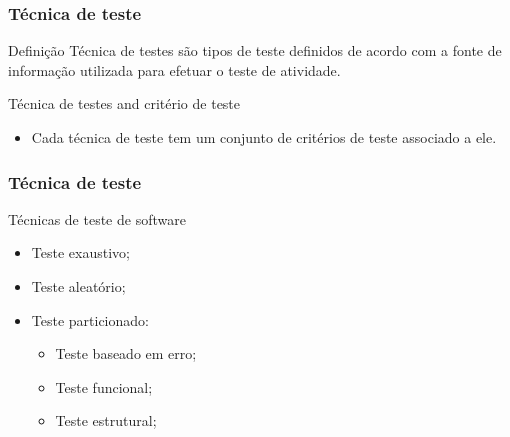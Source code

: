 \begin{frame}[parent={cmap:software-testing-foundations}, hasprev=false, hasnext=true]
\frametitle{Técnica de teste}
\label{concept:test-technique}

\begin{block:concept}{Definição}
Técnica de testes são tipos de teste definidos de acordo com a fonte de informação utilizada para efetuar o teste de atividade.
\end{block:concept}

\begin{block:fact}{Técnica de testes and critério de teste}
\begin{itemize}
    \item Cada técnica de teste tem um conjunto de critérios de teste associado a ele.
\end{itemize}
\end{block:fact}
\end{frame}



\begin{frame}[hasprev=true, hasnext=true]
\frametitle{Técnica de teste}

\begin{block:fact}{Técnicas de teste de software}
\begin{itemize}
	\item Teste exaustivo;

	\item Teste aleatório;

	\item Teste particionado:
	\begin{itemize}
		\item Teste baseado em erro;

		\item Teste funcional;

		\item Teste estrutural;
	\end{itemize}
\end{itemize}
\end{block:fact}
\end{frame}



